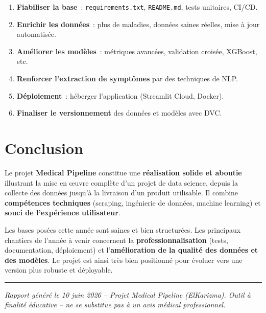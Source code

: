 \documentclass[11pt,a4paper]{article}
\begin{document}
\begin{enumerate}
  \item \textbf{Fiabiliser la base}~: \texttt{requirements.txt}, \texttt{README.md}, tests unitaires, CI/CD.
  \item \textbf{Enrichir les données}~: plus de maladies, données saines réelles, mise à jour automatisée.
  \item \textbf{Améliorer les modèles}~: métriques avancées, validation croisée, XGBoost, etc.
  \item \textbf{Renforcer l'extraction de symptômes} par des techniques de NLP.
  \item \textbf{Déploiement}~: héberger l'application (Streamlit Cloud, Docker).
  \item \textbf{Finaliser le versionnement} des données et modèles avec DVC.
\end{enumerate}

\section{Conclusion}

Le projet \textbf{Medical Pipeline} constitue une \textbf{réalisation solide et aboutie} illustrant la mise en œuvre complète d'un projet de data science, depuis la collecte des données jusqu'à la livraison d'un produit utilisable. Il combine \textbf{compétences techniques} (scraping, ingénierie de données, machine learning) et \textbf{souci de l'expérience utilisateur}.

Les bases posées cette année sont saines et bien structurées. Les principaux chantiers de l'année à venir concernent la \textbf{professionnalisation} (tests, documentation, déploiement) et l'\textbf{amélioration de la qualité des données et des modèles}. Le projet est ainsi très bien positionné pour évoluer vers une version plus robuste et déployable.

\vspace{1.5cm}
\hrule
\vspace{0.3cm}
{\small\itshape Rapport généré le 10 juin 2026 -- Projet Medical Pipeline (ElKarizma). Outil à finalité éducative -- ne se substitue pas à un avis médical professionnel.}
\end{document}
